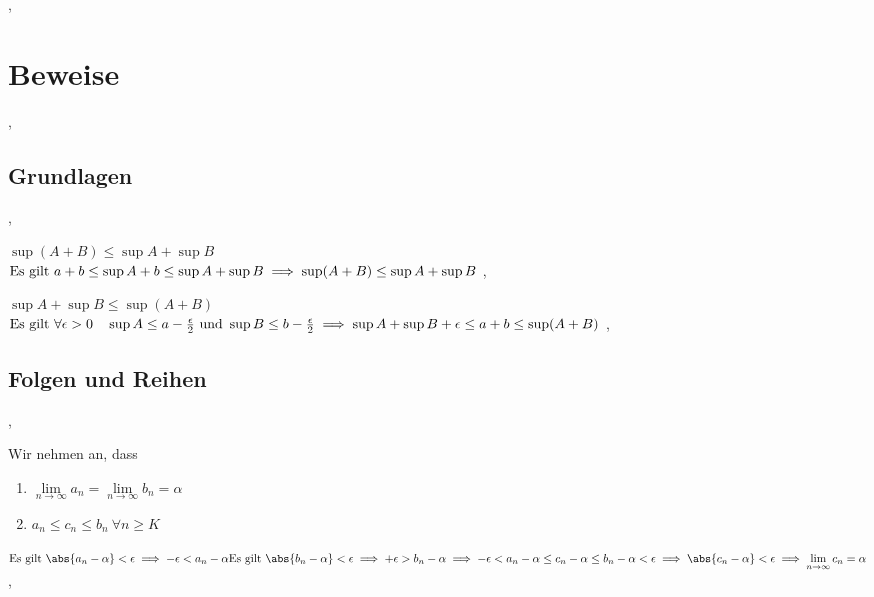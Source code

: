 \sep

\section{Beweise}
\sep
\subsection{Grundlagen}
\sep

\Beweis $\sup (A + B) \leq \sup A + \sup B$ \\
\(
\text{Es gilt } a + b \leq \sup A + b \leq \sup A + \sup B \\
\implies \sup (A + B) \leq \sup A + \sup B
\)
\sep

\Beweis $\sup A + \sup B \leq \sup(A + B)$  \\
\(
\text{Es gilt } \forall \epsilon > 0 \quad \sup A \leq a -  \frac{\epsilon}{2} \text{ und } \sup B \leq b -  \frac{\epsilon}{2} \\
\implies \sup A + \sup B + \epsilon \leq a + b \leq \sup (A + B) 
\)
\sep

\subsection{Folgen und Reihen}
\sep

 Wir nehmen an, dass 
\begin{enumerate}
\item $\lim\limits_{n \rightarrow \infty} a_{n} = \lim\limits_{n \rightarrow \infty} b_{n} = \alpha$ 
\item $a_{n} \leq c_{n} \leq b_{n} \ \forall n \geq K$
\end{enumerate}

\(
\text{Es gilt } \abs{a_n - \alpha} < \epsilon \implies - \epsilon < a_n - \alpha \\
\text{Es gilt } \abs{b_n - \alpha} < \epsilon \implies + \epsilon > b_n - \alpha \\
\implies - \epsilon < a_n - \alpha \leq c_n - \alpha \leq b_n - \alpha < \epsilon \\
\implies \abs{c_n - \alpha} < \epsilon \implies \lim\limits_{n \rightarrow \infty} c_{n} = \alpha
\)
\sep